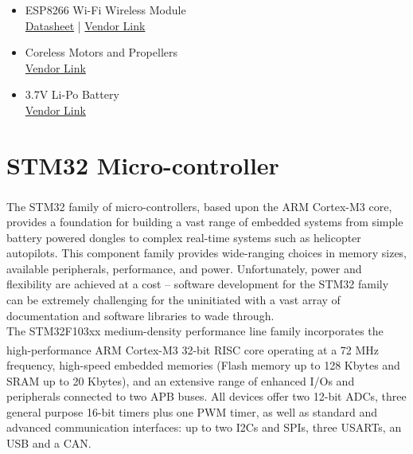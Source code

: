\documentclass[a4paper,12pt,oneside]{book}
\begin{document}
\begin{itemize}
\begin{itemize}
\item ESP8266 Wi-Fi Wireless Module\\
\href{./datasheets/ESP8266-Datasheet.pdf}{Datasheet} | \href{http://www.amazon.in/ESP8266-Serial-Wireless-Arduino-Raspberry/dp/B00TS5TMRK/ref=sr_1_3?ie=UTF8&qid=1499068563&sr=8-3&keywords=ESP8266}{Vendor Link}

\item Coreless Motors and Propellers \\
\href{http://www.amazon.in/Engineerstoys-Coreless-Motor-Propeller-Set/dp/B01HTIN6CE/ref=sr_1_2?ie=UTF8&qid=1499068914&sr=8-2&keywords=coreless+motor}{Vendor Link}

\item 3.7V Li-Po Battery \\
\href{http://www.amazon.in/Generic-Cheerson-Quadcopter-Ariplane-shipping/dp/B071XYV3HR/ref=sr_1_8?ie=UTF8&qid=1499068765&sr=8-8&keywords=3.7v+lipo}{Vendor Link}

\end{itemize}
\end{itemize}

\section{STM32 Micro-controller}
The STM32 family of micro-controllers, based upon the ARM\textsuperscript{\textregistered} Cortex\textsuperscript{\textregistered}-M3 core, provides a foundation for building a vast range of embedded systems from simple battery powered dongles to complex real-time systems such as helicopter autopilots. This component family provides wide-ranging choices in memory sizes, available peripherals, performance, and power. Unfortunately, power and flexibility are achieved at a cost – software development for the STM32 family can be extremely challenging for the uninitiated with a vast array of documentation and software libraries to wade through.\cite{geob} \\

The STM32F103xx medium-density performance line family incorporates the high-performance ARM\textsuperscript{\textregistered} Cortex\textsuperscript{\textregistered}-M3 32-bit RISC core operating at a 72 MHz frequency, high-speed embedded memories (Flash memory up to 128 Kbytes and SRAM up to 20 Kbytes), and an extensive range of enhanced I/Os and peripherals connected to two APB buses. All devices offer two 12-bit ADCs, three general purpose 16-bit timers plus one PWM timer, as well as standard and advanced communication interfaces: up to two I2Cs and SPIs, three USARTs, an USB and a CAN.\cite{stm32}
\end{document}
